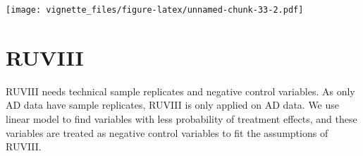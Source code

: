 \documentclass[]{book}
\newenvironment{Shaded}{\begin{snugshade}}{\end{snugshade}}
\newcommand{\KeywordTok}[1]{\textcolor[rgb]{0.13,0.29,0.53}{\textbf{#1}}}
\newcommand{\DecValTok}[1]{\textcolor[rgb]{0.00,0.00,0.81}{#1}}
\newcommand{\StringTok}[1]{\textcolor[rgb]{0.31,0.60,0.02}{#1}}
\newcommand{\CommentTok}[1]{\textcolor[rgb]{0.56,0.35,0.01}{\textit{#1}}}
\newcommand{\OtherTok}[1]{\textcolor[rgb]{0.56,0.35,0.01}{#1}}
\newcommand{\ControlFlowTok}[1]{\textcolor[rgb]{0.13,0.29,0.53}{\textbf{#1}}}
\newcommand{\OperatorTok}[1]{\textcolor[rgb]{0.81,0.36,0.00}{\textbf{#1}}}
\newcommand{\NormalTok}[1]{#1}
\begin{document}
\texttt{[image: vignette\_files/figure-latex/unnamed-chunk-33-2.pdf]}

\begin{Shaded}
\end{Shaded}

\section{RUVIII}\label{ruviii}

RUVIII needs technical sample replicates and negative control variables.
As only AD data have sample replicates, RUVIII is only applied on AD
data. We use linear model to find variables with less probability of
treatment effects, and these variables are treated as negative control
variables to fit the assumptions of RUVIII.
\end{document}
